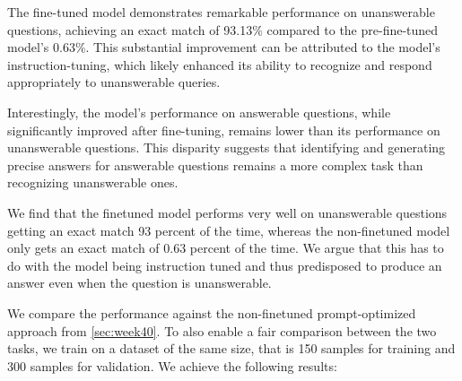 \documentclass[11pt]{article}
\begin{document}
\begin{table}[ht]
    \centering
    \caption{Performance comparison for answerable and unanswerable questions}
    \label{tab:week41_non_answerable_performance}
\end{table}

The fine-tuned model demonstrates remarkable performance on unanswerable questions, achieving an exact match of 93.13\% compared to the pre-fine-tuned model's 0.63\%. This substantial improvement can be attributed to the model's instruction-tuning, which likely enhanced its ability to recognize and respond appropriately to unanswerable queries.

Interestingly, the model's performance on answerable questions, while significantly improved after fine-tuning, remains lower than its performance on unanswerable questions. This disparity suggests that identifying and generating precise answers for answerable questions remains a more complex task than recognizing unanswerable ones.

We find that the finetuned model performs very well on unanswerable questions getting an exact match 93 percent of the time, whereas the 
non-finetuned model only gets an exact match of 0.63 percent of the time. 
We argue that this has to do with the model being instruction tuned and 
thus predisposed to produce an answer even when the question is unanswerable.

We compare the performance against the non-finetuned prompt-optimized approach from \ref{sec:week40}.
To also enable a fair comparison between the two tasks, we train on a dataset of the same size, that is 150 samples for training and 300 samples for validation.
We achieve the following results:
\end{document}
